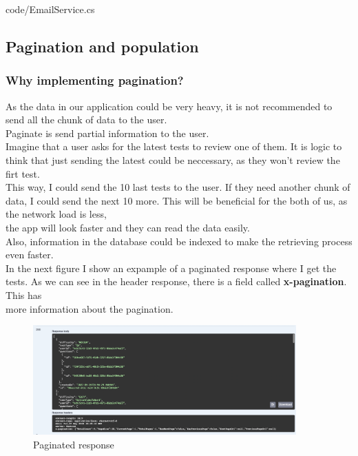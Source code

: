     
    {code/EmailService.cs}

    \subsection{Pagination and population}
        \subsubsection{Why implementing pagination?}
        As the data in our application could be very heavy, it is not recommended to send all the chunk of data to the user. \\
        Paginate is send partial information to the user. \\

        Imagine that a user asks for the latest tests to review one of them. It is logic to think that just sending the latest could be neccessary, as they won't review the firt test. \\
        This way, I could send the 10 last tests to the user. If they need another chunk of data, I could send the next 10 more. This will be beneficial for the both of us, as the network load is less, \\
        the app will look faster and they can read the data easily. \\
        Also, information in the database could be indexed to make the retrieving process even faster. \\

        In the next figure I show an expample of a paginated response where I get the tests. As we can see in the header response, there is a field called \textbf{x-pagination}. This has \\
        more information about the pagination.

        \begin{figure}[H]
            \centering
                \includegraphics[width=0.9\textwidth]{assets/pagination.png}
            \caption{Paginated response}
            \label{fig:impl_pagination}
        \end{figure}

